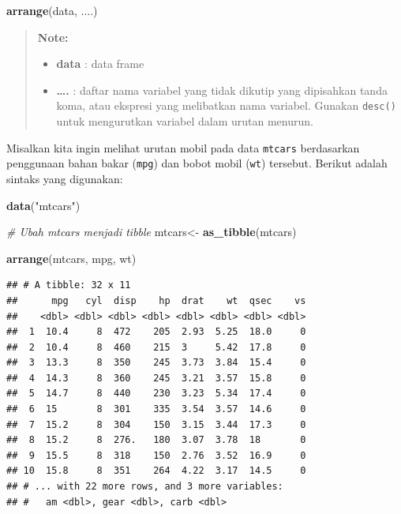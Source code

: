 \documentclass[]{book}
\newenvironment{Shaded}{\begin{snugshade}}{\end{snugshade}}
\newcommand{\KeywordTok}[1]{\textcolor[rgb]{0.13,0.29,0.53}{\textbf{#1}}}
\newcommand{\StringTok}[1]{\textcolor[rgb]{0.31,0.60,0.02}{#1}}
\newcommand{\CommentTok}[1]{\textcolor[rgb]{0.56,0.35,0.01}{\textit{#1}}}
\newcommand{\NormalTok}[1]{#1}
\providecommand{\tightlist}{%
  \setlength{\itemsep}{0pt}\setlength{\parskip}{0pt}}
\begin{document}
\begin{Shaded}
\begin{Highlighting}[]
\KeywordTok{arrange}\NormalTok{(data, ....)}
\end{Highlighting}
\end{Shaded}

\begin{quote}
\textbf{Note: }

\begin{itemize}
\tightlist
\item
  \textbf{data} : data frame
\item
  \textbf{\ldots{}.} : daftar nama variabel yang tidak dikutip yang
  dipisahkan tanda koma, atau ekspresi yang melibatkan nama variabel.
  Gunakan \texttt{desc()} untuk mengurutkan variabel dalam urutan
  menurun.
\end{itemize}
\end{quote}

Misalkan kita ingin melihat urutan mobil pada data \texttt{mtcars}
berdasarkan penggunaan bahan bakar (\texttt{mpg}) dan bobot mobil
(\texttt{wt}) tersebut. Berikut adalah sintaks yang digunakan:

\begin{Shaded}
\begin{Highlighting}[]
\KeywordTok{data}\NormalTok{(}\StringTok{"mtcars"}\NormalTok{)}

\CommentTok{# Ubah mtcars menjadi tibble}
\NormalTok{mtcars<-}\StringTok{ }\KeywordTok{as_tibble}\NormalTok{(mtcars)}

\KeywordTok{arrange}\NormalTok{(mtcars, mpg, wt)}
\end{Highlighting}
\end{Shaded}

\begin{verbatim}
## # A tibble: 32 x 11
##      mpg   cyl  disp    hp  drat    wt  qsec    vs
##    <dbl> <dbl> <dbl> <dbl> <dbl> <dbl> <dbl> <dbl>
##  1  10.4     8  472    205  2.93  5.25  18.0     0
##  2  10.4     8  460    215  3     5.42  17.8     0
##  3  13.3     8  350    245  3.73  3.84  15.4     0
##  4  14.3     8  360    245  3.21  3.57  15.8     0
##  5  14.7     8  440    230  3.23  5.34  17.4     0
##  6  15       8  301    335  3.54  3.57  14.6     0
##  7  15.2     8  304    150  3.15  3.44  17.3     0
##  8  15.2     8  276.   180  3.07  3.78  18       0
##  9  15.5     8  318    150  2.76  3.52  16.9     0
## 10  15.8     8  351    264  4.22  3.17  14.5     0
## # ... with 22 more rows, and 3 more variables:
## #   am <dbl>, gear <dbl>, carb <dbl>
\end{verbatim}
\end{document}
